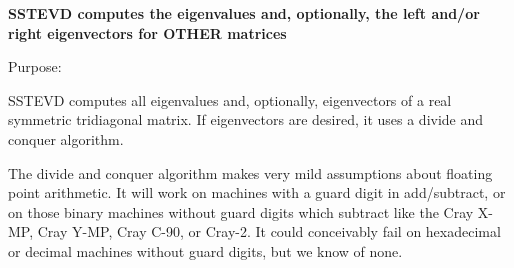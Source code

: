 {\bfseries  S\+S\+T\+E\+V\+D computes the eigenvalues and, optionally, the left and/or right eigenvectors for O\+T\+H\+E\+R matrices} 

 \begin{DoxyParagraph}{Purpose\+: }
\begin{DoxyVerb} SSTEVD computes all eigenvalues and, optionally, eigenvectors of a
 real symmetric tridiagonal matrix. If eigenvectors are desired, it
 uses a divide and conquer algorithm.

 The divide and conquer algorithm makes very mild assumptions about
 floating point arithmetic. It will work on machines with a guard
 digit in add/subtract, or on those binary machines without guard
 digits which subtract like the Cray X-MP, Cray Y-MP, Cray C-90, or
 Cray-2. It could conceivably fail on hexadecimal or decimal machines
 without guard digits, but we know of none.\end{DoxyVerb}
 
\end{DoxyParagraph}


